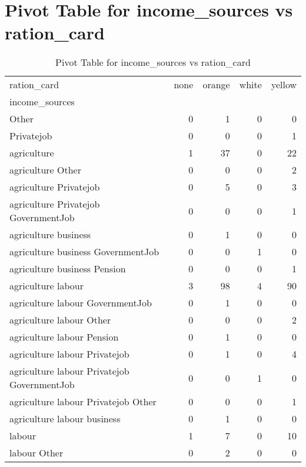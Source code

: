 \documentclass{article}
\begin{document}
\section{Pivot Table for income_sources vs ration_card}
\begin{table}
\caption{Pivot Table for income_sources vs ration_card}
\label{tab:income_sources_ration_card}
\begin{tabular}{lrrrr}
\toprule
ration_card & none & orange & white & yellow \\
income_sources &  &  &  &  \\
\midrule
Other & 0 & 1 & 0 & 0 \\
Privatejob & 0 & 0 & 0 & 1 \\
agriculture & 1 & 37 & 0 & 22 \\
agriculture Other & 0 & 0 & 0 & 2 \\
agriculture Privatejob & 0 & 5 & 0 & 3 \\
agriculture Privatejob GovernmentJob & 0 & 0 & 0 & 1 \\
agriculture business & 0 & 1 & 0 & 0 \\
agriculture business GovernmentJob & 0 & 0 & 1 & 0 \\
agriculture business Pension & 0 & 0 & 0 & 1 \\
agriculture labour & 3 & 98 & 4 & 90 \\
agriculture labour GovernmentJob & 0 & 1 & 0 & 0 \\
agriculture labour Other & 0 & 0 & 0 & 2 \\
agriculture labour Pension & 0 & 1 & 0 & 0 \\
agriculture labour Privatejob & 0 & 1 & 0 & 4 \\
agriculture labour Privatejob GovernmentJob & 0 & 0 & 1 & 0 \\
agriculture labour Privatejob Other & 0 & 0 & 0 & 1 \\
agriculture labour business & 0 & 1 & 0 & 0 \\
labour & 1 & 7 & 0 & 10 \\
labour Other & 0 & 2 & 0 & 0 \\
\bottomrule
\end{tabular}
\end{table}
\end{document}
